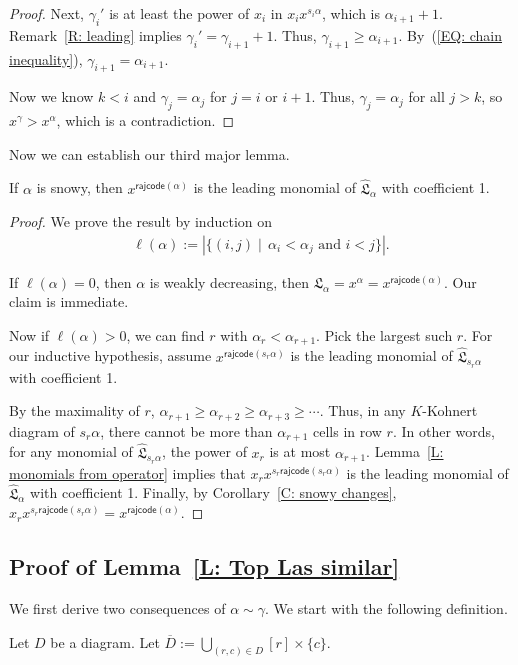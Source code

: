 \documentclass[ALCO]{cedram}
\newenvironment{manuallemma}[1]{
  \renewcommand\themanuallemmainner{#1}
  \manuallemmainner
}{\endmanuallemmainner}
\newcommand{\fL}{\mathfrak{L}}
\newcommand{\fLb}{\fL}
\newcommand{\topLas}{\widehat{\fL}}
\newcommand{\rajcode}{\mathsf{rajcode}}
\begin{document}
\begin{proof}
Next, 
$\gamma_{i}'$ is at least
the power of $x_{i}$ in $x_ix^{s_i \alpha}$,
which is $\alpha_{i+1} + 1$.
Remark~\ref{R: leading} implies $\gamma_i' = \gamma_{i+1} + 1$.
Thus, $\gamma_{i+1} \geqslant \alpha_{i+1}$.
By~(\ref{EQ: chain inequality}), $\gamma_{i+1} = \alpha_{i+1}$.

Now we know $k < i$
and $\gamma_j = \alpha_j$ for $j = i$ or $i+1$.
Thus, $\gamma_j = \alpha_j$ for all $j > k$,
so~$x^\gamma > x^\alpha$, which is a contradiction. 
\end{proof}

Now we can establish our third major lemma. 
\begin{manuallemma}{\ref{L: snowy leading}}
If $\alpha$ is snowy, 
then $x^{\rajcode(\alpha)}$ is the leading monomial of 
$\topLas_\alpha$ with coefficient 1.
\end{manuallemma}
\begin{proof}
We prove the result by induction on 
\begin{align*}
\ell(\alpha) := |\{(i,j) \mid\, \alpha_i < \alpha_j \text{ and } i < j\}|.
\end{align*}

If $\ell(\alpha)=0$, then $\alpha$ is weakly decreasing, 
then $\fLb_\alpha = 
x^\alpha = x^{\rajcode(\alpha)}$.
Our claim is immediate. 

Now if $\ell(\alpha) > 0$,
we can find $r$ with $\alpha_r < \alpha_{r+1}$.
Pick the largest such $r$.
For our inductive hypothesis,
assume $x^{\rajcode(s_r \alpha)}$ is the leading monomial 
of $\topLas_{s_r \alpha}$ with coefficient 1.

By the maximality of $r$, 
$\alpha_{r+1} \geqslant \alpha_{r+2} 
\geqslant \alpha_{r+3} \geqslant \cdots$.
Thus, in any $K$-Kohnert diagram of $s_r \alpha$,
there cannot be more than $\alpha_{r+1}$ cells
in row $r$.
In other words, 
for any monomial of $\topLas_{s_r \alpha}$,
the power of $x_r$ is at most $\alpha_{r+1}$.
Lemma~\ref{L: monomials from operator} implies that $x_r x^{s_r \rajcode(s_r \alpha)}$
is the leading monomial of $\topLas_{\alpha}$ with coefficient 1. 
Finally, by Corollary~\ref{C: snowy changes},
$x_r x^{s_r \rajcode(s_r \alpha)} = x^{\rajcode(\alpha)}$.
\end{proof}


\subsection{Proof of Lemma~\ref{L: Top Las similar}}
\label{SS: last major lemma}
We first derive two consequences 
of $\alpha \sim \gamma$.
We start with the following definition.
\begin{defn}
Let $D$ be a diagram.
Let $\overline{D} := \bigcup_{(r,c) \in D} [r] \times \{c\}$.
\end{defn}
\end{document}
